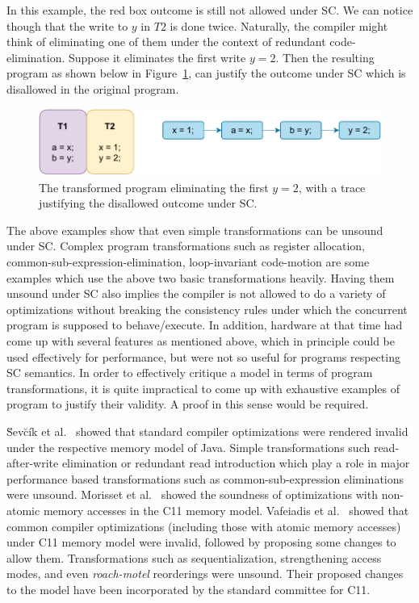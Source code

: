     In this example, the red box outcome is still not allowed under SC. We can notice though that the write to $y$ in $T2$ is done twice. 
    Naturally, the compiler might think of eliminating one of them under the context of redundant code-elimination. 
    Suppose it eliminates the first write $y=2$. 
    Then the resulting program as shown below in Figure~\ref{intro:Example3(b)}, can justify the outcome under SC which is disallowed in the original program.
    \begin{figure}[H]
        \centering
        \includegraphics[scale=0.7]{2.Background/SC_Example2(b).pdf}
        \caption{The transformed program eliminating the first $y=2$, with a trace justifying the disallowed outcome under SC.}
        \label{intro:Example3(b)}
    \end{figure}

    The above examples show that even simple transformations can be unsound under SC. Complex program transformations such as register allocation, common-sub-expression-elimination, loop-invariant code-motion are some examples which use the above two basic transformations heavily. 
    Having them unsound under SC also implies the compiler is not allowed to do a variety of optimizations without breaking the consistency rules under which the concurrent program is supposed to behave/execute. 
    In addition, hardware at that time had come up with several features as mentioned above, which in principle could be used effectively for performance, but were not so useful for programs respecting SC semantics. 
    In order to effectively critique a model in terms of program transformations, it is quite impractical to come up with exhaustive examples of program to justify their validity.
    A proof in this sense would be required.  

    \u{S}ev\u{c}\'{i}k et al.~\cite{SevcikJ} showed that standard compiler optimizations were rendered invalid under the respective memory model of Java. Simple transformations such read-after-write elimination or redundant read introduction which play a role in major performance based transformations such as common-sub-expression eliminations were unsound. 
    Morisset et al.~\cite{Morisset} showed the soundness of optimizations with non-atomic memory accesses in the C11 memory model. 
    Vafeiadis et al.~\cite{VafeiadisV} showed that common compiler optimizations (including those with atomic memory accesses) under C11 memory model were invalid, followed by proposing some changes to allow them. 
    Transformations such as sequentialization, strengthening access modes, and even \textit{roach-motel} reorderings were unsound. Their proposed changes to the model have been incorporated by the standard committee for C11. 

